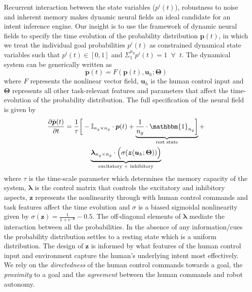 Recurrent interaction between the state variables ($p^i(t)$), 
robustness to noise and inherent memory makes dynamic neural fields an ideal candidate for an intent inference engine. Our insight is to use the framework of dynamic neural fields to specify the time evolution of the probability distribution $\boldsymbol{p}(t)$, in which we treat the individual goal probabilities $p^i(t)$ as constrained dynamical state variables such that $p^i(t) \in [0, 1]$ and $\Sigma_{1}^{n_g}p^{i}(t) = 1 \;\;\forall\;\; t$. The dynamical system can be generically written as 
\begin{equation}
\dot{\boldsymbol{p}}(t) = F(\boldsymbol{p}(t), \boldsymbol{u}_h ; \boldsymbol{\Theta})
\end{equation}
where $F$ represents the nonlinear vector field, $\boldsymbol{u}_h$ is the human control input and $\boldsymbol{\Theta}$ represents all other task-relevant features and parameters that affect the time-evolution of the probability distribution. 
The full specification of the neural field is given by
\begin{multline}\label{eq:dft}
\frac{\partial \dot{\boldsymbol{p}}(t)}{\partial t} = \frac{1}{\tau}\bigg[-\mathbb{I}_{n_g\times n_g}\cdot\boldsymbol{p}(t) + \underbrace{\frac{1}{n_g}\cdot\mathbbm{1}_{n_g}\bigg]}_{\text{rest state}} + \\ \underbrace{\boldsymbol{\lambda}_{n_g\times n_g}\cdot\Big(\sigma(\boldsymbol{z}(\boldsymbol{u}_h;\boldsymbol{\Theta}))\Big)}_{\text{excitatory + inhibitory}}
\end{multline}
where $\tau$ is the time-scale parameter which determines the memory capacity of the system, $\boldsymbol{\lambda}$ is the control matrix that controls the excitatory and inhibitory aspects, $\boldsymbol{z}$ represents the nonlinearity through with human control commands and task features affect the time evolution and $\sigma$ is a biased sigmoidal nonlinearity given by $\sigma(\boldsymbol{z}) = \frac{1}{1 + e^{-\boldsymbol{z}}} - 0.5$.
The off-diagonal elements of $\boldsymbol{\lambda}$ mediate the interaction between all the probabilities. In the absence of any information/cues the probability distribution settles to a resting state which is a uniform distribution. The design of $\boldsymbol{z}$ is informed by what features of the human control input and environment capture the human's underlying intent most effectively. We rely on the \textit{directedness} of the human control commands towards a goal, the \textit{proximity} to a goal and the \textit{agreement} between the human commands and robot autonomy. 
